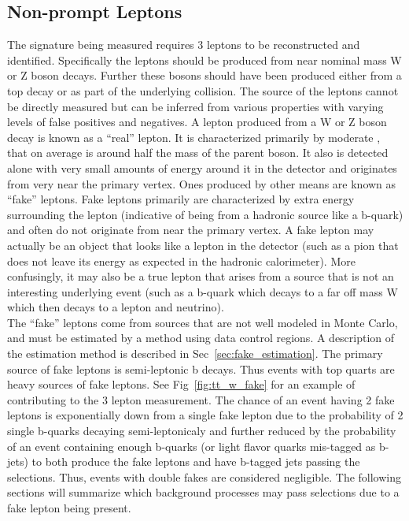 		\subsection{Non-prompt Leptons}		
		The \ttZ signature being measured requires 3 leptons to be reconstructed and identified. Specifically the leptons should be produced from near nominal mass W or Z boson decays. Further these bosons should have been produced either from a top decay or as part of the underlying collision. The source of the leptons cannot be directly measured but can be inferred from various properties with varying levels of false positives and negatives. A lepton produced from a W or Z boson decay is known as a ``real'' lepton. It is characterized primarily by moderate \pt, that on average is around half the mass of the parent boson. It also is detected alone with very small amounts of energy around it in the detector and originates from very near the primary vertex. Ones produced by other means are known as ``fake'' leptons. Fake leptons primarily are characterized by extra energy surrounding the lepton (indicative of being from a hadronic source like a b-quark) and often do not originate from near the primary vertex. A fake lepton may actually be an object that looks like a lepton in the detector (such as a pion that does not leave its energy as expected in the hadronic calorimeter). More confusingly, it may also be a true lepton that arises from a source that is not an interesting underlying event (such as a b-quark which decays to a far off mass W which then decays to a lepton and neutrino).\\
		
		The ``fake'' leptons come from sources that are not well modeled in Monte Carlo, and must be estimated by a method using data control regions. A description of the estimation method is described in Sec~\ref{sec:fake_estimation}. The primary source of fake leptons is semi-leptonic b decays. Thus events with top quarts are heavy sources of fake leptons. See Fig~\ref{fig:tt_w_fake} for an example of \ttbar contributing to the 3 lepton measurement. The chance of an event having 2 fake leptons is exponentially down from a single fake lepton due to the probability of 2 single b-quarks decaying semi-leptonicaly and further reduced by the probability of an event containing enough b-quarks (or light flavor quarks mis-tagged as b-jets) to both produce the fake leptons and have b-tagged jets passing the selections. Thus,  events with double fakes are considered negligible. The following sections will summarize which background processes may pass selections due to a fake lepton being present.\\
		
